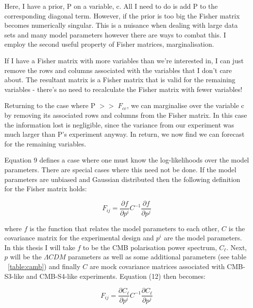 Here, I have a prior, P on a variable, c. All I need to do is add P to the corresponding diagonal term. However, if the prior is too big the Fisher matrix becomes numerically singular. This is a nuisance when dealing with large data sets and many model parameters however there are ways to combat this. I employ the second useful property of Fisher matrices, marginalisation.

If I have a Fisher matrix with more variables than we're interested in, I can just remove the rows and columns associated with the variables that I don't care about. The resultant matrix is a Fisher matrix that is valid for the remaining variables - there's no need to recalculate the Fisher matrix with fewer variables!

Returning to the case where P $>>$ $F_{cc}$, we can marginalise over the variable c by removing its associated rows and columns from the Fisher matrix. In this case the information lost is negligible, since the variance from our experiment was much larger than P's experiment anyway. In return, we now find we can forecast for the remaining variables.

Equation 9 defines a case where one must know the log-likelihoods over the model parameters. There are special cases where this need not be done. If the model parameters are unbiased and Gaussian distributed then the following definition for the Fisher matrix holds:

\begin{equation}
\label{eqn:fishermatrix}
F_{ij} = \frac{\partial f}{\partial p^i} C^{-1} \frac{\partial f}{\partial p^j}
\end{equation}

where $f$ is the function that relates the model parameters to each other, $C$ is the covariance matrix for the experimental design and $p^{i}$ are the model parameters. In this thesis I will take $f$ to be the CMB polarisation power spectrum, $C_{\ell}$. Next, ${p}$ will be the $\Lambda CDM$ parameters as well as some additional parameters (see table ~\ref{table:camb}) and finally $C$ are mock covariance matrices associated with CMB-S3-like and CMB-S4-like experiments. Equation (12) then becomes:

\begin{equation}
\label{eqn:clfisher}
F_{ij} = \frac{\partial C_{\ell}}{\partial p^i} C^{-1} \frac{\partial C_{\ell}}{\partial p^j}
\end{equation}

